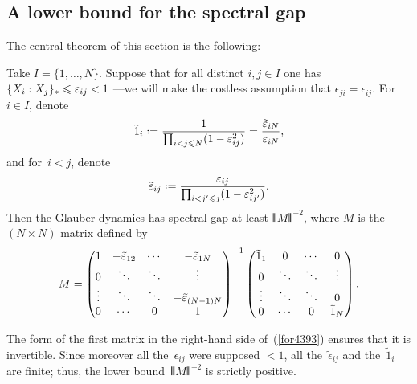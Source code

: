 \subsection{A lower bound for the spectral gap}

The central theorem of this section is the following:
\begin{Thm}\label{t7230}
Take $I = \{1,\ldots,N\}$.
Suppose that for all distinct $i,j\in I$ one has ${\{X_i:X_j\}_\ast} \allowbreak \leqslant \varepsilon_{ij} < 1$
—we will make the costless assumption that $\epsilon_{ji} = \epsilon_{ij}$.
For~$i \in I$, denote
\[ \tilde1_i \coloneqq \frac{1}{ \prod_{i<j\leq N} (1-\epsilon_{ij}^2) }
= \frac{\teps_{iN}}{\epsilon_{iN}} ,\]
and for~$i < j$, denote
\[ \teps_{ij} \coloneqq
\frac{\epsilon_{ij}}{\prod_{i<j'\leq j}(1-\epsilon_{ij'}^2)} .\]
Then the Glauber dynamics has spectral gap at least $\VERT M \VERT^{-2}$,
where $M$ is the $(N \times N)$ matrix defined by
\[\label{for4393} M = \begin{pmatrix} 1 & -\teps_{12} & \cdots & -\teps_{1N} \\
0 & \ddots & \ddots & \vdots \\
\vdots & \ddots & \ddots & -\teps_{(N-1)N} \\
0 & \cdots & 0 & 1 \end{pmatrix}^{-1}
\begin{pmatrix} \tilde1_1 & 0 & \cdots & 0 \\
0 & \ddots & \ddots & \vdots \\
\vdots & \ddots & \ddots & 0 \\
0 & \cdots & 0 & \tilde1_N \end{pmatrix} .\]
\end{Thm}
%
\begin{Rmk}\label{rmk4123}
The form of the first matrix in the right-hand side of~(\ref{for4393})
ensures that it is invertible.
Since moreover all the~$\epsilon_{ij}$ were supposed $<1$,
all the~$\tilde\epsilon_{ij}$ and the~$\tilde{1}_i$ are finite;
thus, the lower bound~$\VERT M \VERT^{-2}$ is strictly positive.
\end{Rmk}

